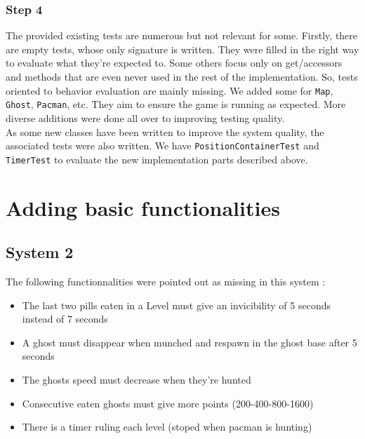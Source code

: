 \documentclass[]{article}
\begin{document}
\subsubsection{Step 4}

\indent \par The provided existing tests are numerous but not relevant for some. Firstly, there are empty tests, whose only signature is written. They were filled in the right way to evaluate what they're expected to. Some others focus only on get/accessors and methods that are even never used in the rest of the implementation. So, tests oriented to behavior evaluation are mainly missing. We added some for \texttt{Map}, \texttt{Ghost}, \texttt{Pacman}, etc. They aim to ensure the game is running as expected. More diverse additions were done all over to improving testing quality.\\

As some new classes have been written to improve the system quality, the associated tests were also written. We have \texttt{PositionContainerTest} and \texttt{TimerTest} to evaluate the new implementation parts described above.

\newpage
\section{Adding basic functionalities}

\subsection{System 2}

The following functionnalities were pointed out as missing in this system :

\begin{itemize}
\item The last two pills eaten in a Level must give an invicibility of 5 seconds instead of 7 seconds
\item A ghost must disappear when munched and respawn in the ghost base after 5 seconds
\item The ghosts speed must decrease when they're hunted
\item Consecutive eaten ghosts must give more points (200-400-800-1600)
\item There is a timer ruling each level (stoped when pacman is hunting)
\end{itemize}

\vspace{0.2cm}
\end{document}
